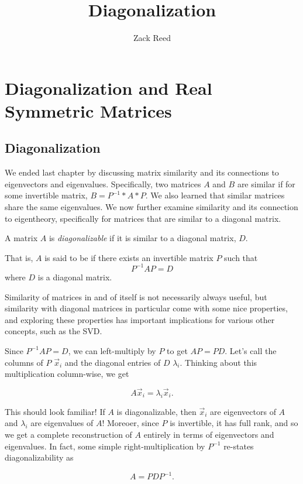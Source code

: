 \documentclass{ximera}
\author{Zack Reed}
\title{Diagonalization}
\begin{document}
\begin{abstract}

\end{abstract}
\maketitle

\section*{Diagonalization and Real Symmetric Matrices}

\subsection*{Diagonalization}

We ended last chapter by discussing matrix similarity and its connections to eigenvectors and eigenvalues. Specifically, two matrices $A$ and $B$ are similar if for some invertible matrix, $B=P^{-1}*A*P$. We also learned that similar matrices share the same eigenvalues. We now further examine similarity and its connection to eigentheory, specifically for matrices that are similar to a diagonal matrix. 

\begin{definition}
  A matrix $A$ is \emph{diagonalizable} if it is similar to a diagonal matrix, $D$. 

  That is, $A$ is said to be  if there exists an invertible matrix $P$ such that
\begin{equation*}
P^{-1}AP=D
\end{equation*}
where $D$ is a diagonal matrix.
\end{definition}

Similarity of matrices in and of itself is not necessarily always useful, but similarity with diagonal matrices in particular come with some nice properties, and exploring these properties has important implications for various other concepts, such as the SVD.

\begin{exploration}

    Since $P^{-1}AP=D$, we can left-multiply by $P$ to get $AP=PD$. Let's call the columns of $P$ $\vec{x}_i$ and the diagonal entries of $D$ $\lambda_i$. Thinking about this multiplication column-wise, we get

    $$A\vec{x}_i=\lambda_i\vec{x}_i.$$

    This should look familiar! If $A$ is diagonalizable, then $\vec{x}_i$ are eigenvectors of $A$ and $\lambda_i$ are eigenvalues of $A$! Moreoer, since $P$ is invertible, it has full rank, and so we get a complete reconstruction of $A$ entirely in terms of eigenvectors and eigenvalues. In fact, some simple right-multiplication by $P^{-1}$ re-states diagonalizability as

    $$A=PDP^{-1}.$$


\end{exploration}
\end{document}
